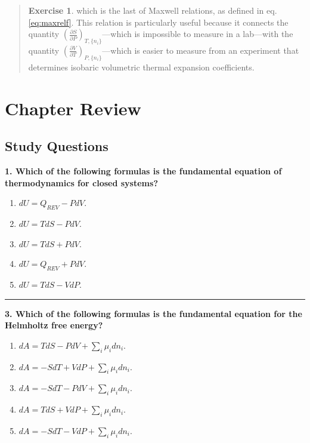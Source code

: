 \documentclass[
  9pt,
]{extbook}
\providecommand{\tightlist}{%
  \setlength{\itemsep}{0pt}\setlength{\parskip}{0pt}}
\theoremstyle{definition}
\theoremstyle{definition}
\theoremstyle{definition}
\newtheorem{exercise}{Exercise}[chapter]
\theoremstyle{remark}
\begin{document}
\begin{quote}
\begin{exercise}
which is the last of Maxwell relations, as defined in eq. \eqref{eq:maxrelf}. This relation is particularly useful because it connects the quantity \(\left(\frac{\partial S}{\partial P} \right)_{T,\{n_i\}}\)---which is impossible to measure in a lab---with the quantity \(\left(\frac{\partial V}{\partial T} \right)_{P,\{n_i\}}\)---which is easier to measure from an experiment that determines isobaric volumetric thermal expansion coefficients.
\end{exercise}
\end{quote}

\hypertarget{rev8}{%
\section{Chapter Review}\label{rev8}}

\hypertarget{quest8}{%
\subsection{Study Questions}\label{quest8}}

\textbf{1. Which of the following formulas is the fundamental equation of thermodynamics for closed systems?}

\begin{enumerate}
\def\labelenumi{\alph{enumi}.}
\tightlist
\item
  \(dU = Q_{REV} - PdV\).
\item
  \(dU = TdS - PdV\).
\item
  \(dU = TdS + PdV\).
\item
  \(dU = Q_{REV} + PdV\).
\item
  \(dU = TdS - VdP\).
\end{enumerate}

\begin{center}\rule{0.5\linewidth}{0.5pt}\end{center}

\textbf{3. Which of the following formulas is the fundamental equation for the Helmholtz free energy?}

\begin{enumerate}
\def\labelenumi{\alph{enumi}.}
\tightlist
\item
  \(dA = TdS - PdV + \sum_i \mu_i dn_i\).
\item
  \(dA = -SdT + VdP + \sum_i \mu_i dn_i\).
\item
  \(dA = -SdT - PdV + \sum_i \mu_i dn_i\).
\item
  \(dA = TdS + VdP + \sum_i \mu_i dn_i\).
\item
  \(dA = -SdT - VdP + \sum_i \mu_i dn_i\).
\end{enumerate}
\end{document}
